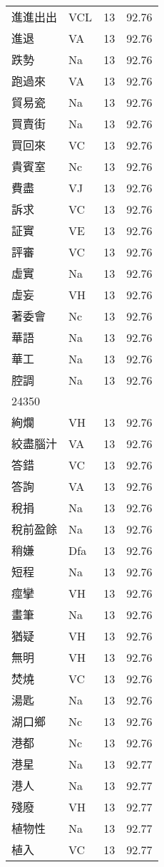 \documentclass[twocolumn]{book}
\begin{document}
\begin{supertabular}{llrr}
進進出出 & VCL & 13 &  92.76\\
進退 & VA & 13 &  92.76\\
跌勢 & Na & 13 &  92.76\\
跑過來 & VA & 13 &  92.76\\
貿易瓷 & Na & 13 &  92.76\\
買賣街 & Na & 13 &  92.76\\
買回來 & VC & 13 &  92.76\\
貴賓室 & Nc & 13 &  92.76\\
費盡 & VJ & 13 &  92.76\\
訴求 & VC & 13 &  92.76\\
証實 & VE & 13 &  92.76\\
評審 & VC & 13 &  92.76\\
虛實 & Na & 13 &  92.76\\
虛妄 & VH & 13 &  92.76\\
著委會 & Nc & 13 &  92.76\\
華語 & Na & 13 &  92.76\\
華工 & Na & 13 &  92.76\\
腔調 & Na & 13 &  92.76\\
24350\\
絢爛 & VH & 13 &  92.76\\
絞盡腦汁 & VA & 13 &  92.76\\
答錯 & VC & 13 &  92.76\\
答詢 & VA & 13 &  92.76\\
稅捐 & Na & 13 &  92.76\\
稅前盈餘 & Na & 13 &  92.76\\
稍嫌 & Dfa & 13 &  92.76\\
短程 & Na & 13 &  92.76\\
痙攣 & VH & 13 &  92.76\\
畫筆 & Na & 13 &  92.76\\
猶疑 & VH & 13 &  92.76\\
無明 & VH & 13 &  92.76\\
焚燒 & VC & 13 &  92.76\\
湯匙 & Na & 13 &  92.76\\
湖口鄉 & Nc & 13 &  92.76\\
港都 & Nc & 13 &  92.76\\
港星 & Na & 13 &  92.77\\
港人 & Na & 13 &  92.77\\
殘廢 & VH & 13 &  92.77\\
植物性 & Na & 13 &  92.77\\
植入 & VC & 13 &  92.77\\

\end{supertabular}
\end{document}

